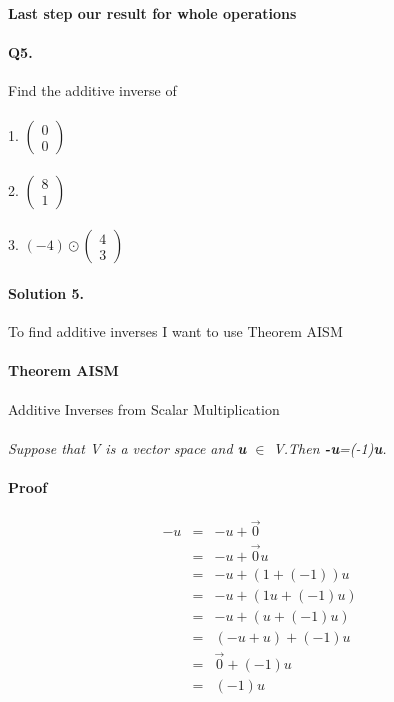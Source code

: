 \documentclass[11pt]{article}
\begin{document}
\paragraph{}\textbf{Last step our result for whole operations}

\paragraph{Q5.}Find the additive inverse of
\paragraph{}1.
$
\begin{pmatrix}
0\\
0
\end{pmatrix}
$
\paragraph{}2.
$
\begin{pmatrix}
8\\
1
\end{pmatrix}
$
\paragraph{}3.
$
(-4)
\odot
\begin{pmatrix}
4\\
3
\end{pmatrix}
$
\paragraph{Solution 5.}To find additive inverses I want to use Theorem AISM
\paragraph{Theorem AISM}Additive Inverses from Scalar Multiplication
\paragraph{}\textit{Suppose that V is a vector space and \textbf{u} $\in$ V.Then \textbf{-u}=(-1)\textbf{u}.}
\paragraph{Proof}
\begin{eqnarray*}
-u&=&-u+\vec{0}
\\&=& -u + \vec{0}u
\\&=& -u +(1+(-1))u
\\&=& -u +(1u+(-1)u)
\\&=& -u +(u + (-1)u)
\\&=& (-u+u) +(-1)u
\\&=& \vec{0}+(-1)u
\\&=&(-1)u
\end{eqnarray*}
\end{document}
